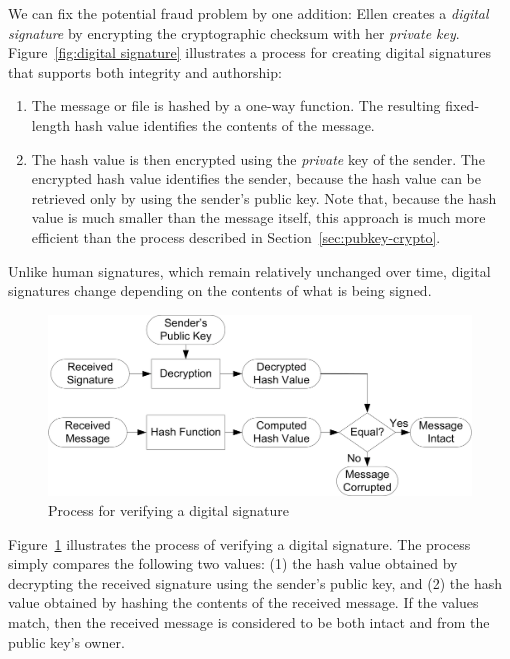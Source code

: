We can fix the potential fraud problem by one addition: Ellen creates
a \emph{digital signature} by encrypting
the cryptographic checksum with her \emph{private key}.
Figure~\ref{fig:digital signature} illustrates a process for creating
digital signatures that supports both integrity and authorship:
\begin{enumerate}
\item The message or file is hashed by a one-way function. The resulting
  fixed-length hash value identifies the contents of the message.
\item The hash value is then encrypted using the \emph{private} key of
  the sender. The encrypted hash value identifies the sender, because
  the hash value can be retrieved only by using the sender's public
  key.  Note that, because the hash value is much smaller than the
  message itself, this approach is much more efficient than the process
  described in Section~\ref{sec:pubkey-crypto}.
\end{enumerate}
Unlike human signatures, which remain relatively unchanged over time,
digital signatures change depending on the contents of what is being
signed.

\begin{figure}[tbp]
  \centering
  \includegraphics[width=4.5in]{Figures/pki/signatureCheck}
  \caption{Process for verifying a digital signature}
  \label{fig:signature verification}
\end{figure}

Figure~\ref{fig:signature verification}
illustrates the process of verifying a digital signature.  The process
simply compares the following two values: (1) the hash value obtained
by decrypting the received signature using the sender's public key,
and (2) the hash value obtained by hashing the contents of the
received message.  If the values match, then the received message is
considered to be both intact and from the public key's owner.



